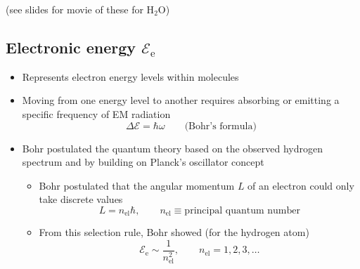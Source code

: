 \documentclass[11pt, oneside]{article}
\begin{document}
\noindent(see slides for movie of these for H$_2$O)

\subsection{Electronic energy $\mathcal{E}_\mathrm{e}$}
\label{s:el}

\begin{itemize}
	\item[--] Represents electron energy levels within molecules
	\item[--] Moving from one energy level to another requires absorbing or emitting a specific frequency of EM radiation
	\begin{equation}
		\label{e:bohr}
		\Delta\mathcal{E} = \hbar\omega \qquad \text{(Bohr's formula)}
	\end{equation}
	\item[--] Bohr postulated the quantum theory based on the observed hydrogen spectrum and by building on Planck's oscillator concept
	\begin{itemize}
		\item[$\hookrightarrow$] Bohr postulated that the angular momentum $L$ of an electron could only take discrete values
		\begin{equation}
			\label{e:L}
			L = n_\mathrm{el}\hbar, \qquad n_\mathrm{el} \equiv \text{principal quantum number}
		\end{equation}
		\item[$\hookrightarrow$] From this selection rule, Bohr showed (for the hydrogen atom)
		\begin{equation}
			\label{e:Eesim}
			\mathcal{E}_\mathrm{e} \sim \frac{1}{n_\mathrm{el}^2}, \qquad n_\mathrm{el} = 1, 2, 3, \ldots
		\end{equation}

\end{itemize}
\end{itemize}
\end{document}
